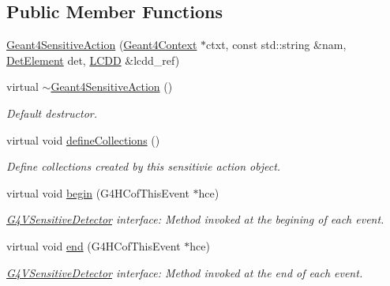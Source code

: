 \subsection*{Public Member Functions}
\begin{DoxyCompactItemize}
\item 
\hyperlink{class_tests_1_1_geant4_sensitive_action_a0ed0ce7ae78a2d675419e5a1241b7570}{Geant4\+Sensitive\+Action} (\hyperlink{class_d_d4hep_1_1_simulation_1_1_geant4_context}{Geant4\+Context} $\ast$ctxt, const std\+::string \&nam, \hyperlink{class_d_d4hep_1_1_simulation_1_1_geant4_sensitive_a1cb1af5fb1194be1e1c1137f1e54272b}{Det\+Element} det, \hyperlink{class_d_d4hep_1_1_simulation_1_1_geant4_sensitive_a3373caa6917867ca7c871df20fb467c8}{L\+C\+DD} \&lcdd\+\_\+ref)
\item 
virtual \hyperlink{class_tests_1_1_geant4_sensitive_action_a64a85815a59aaada8e3f08a8f02eadf1}{$\sim$\+Geant4\+Sensitive\+Action} ()
\begin{DoxyCompactList}\small\item\em Default destructor. \end{DoxyCompactList}\item 
virtual void \hyperlink{class_tests_1_1_geant4_sensitive_action_a0083f23f8b2160bc6e03ccd11077182c}{define\+Collections} ()
\begin{DoxyCompactList}\small\item\em Define collections created by this sensitivie action object. \end{DoxyCompactList}\item 
virtual void \hyperlink{class_tests_1_1_geant4_sensitive_action_a739fa2551e0217a591c5e99ae09d883a}{begin} (G4\+H\+Cof\+This\+Event $\ast$hce)
\begin{DoxyCompactList}\small\item\em \hyperlink{class_g4_v_sensitive_detector}{G4\+V\+Sensitive\+Detector} interface\+: Method invoked at the begining of each event. \end{DoxyCompactList}\item 
virtual void \hyperlink{class_tests_1_1_geant4_sensitive_action_aeeb492550f054b8dd9f4780601fc1d66}{end} (G4\+H\+Cof\+This\+Event $\ast$hce)
\begin{DoxyCompactList}\small\item\em \hyperlink{class_g4_v_sensitive_detector}{G4\+V\+Sensitive\+Detector} interface\+: Method invoked at the end of each event. \end{DoxyCompactList}\item 

\end{DoxyCompactItemize}
